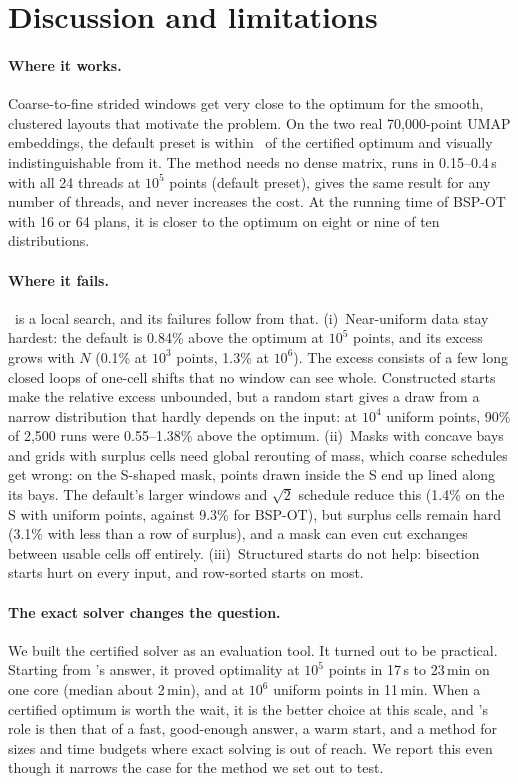 \section{Discussion and limitations}
\label{sec:discussion}

\paragraph{Where it works.} Coarse-to-fine strided windows get very close
to the optimum for the smooth, clustered layouts that motivate the problem. On the two
real 70{,}000-point UMAP embeddings, the default preset is within \RealBalancedExcess\ of
the certified optimum and visually indistinguishable from it. The method needs no dense
matrix, runs in 0.15--0.4\,s with all 24 threads at $10^5$ points (default preset), gives the
same result for any number of threads, and never increases the cost. At the running time of
BSP-OT with 16 or 64 plans, it is closer to the optimum on eight or nine of ten distributions.

\paragraph{Where it fails.} \ShuffleSnap\ is a local search, and its failures
follow from that. (i)~Near-uniform data stay hardest: the default is 0.84\% above the
optimum at $10^5$ points, and its excess grows with $N$ (0.1\% at $10^3$ points, 1.3\% at
$10^6$). The excess consists of a few long closed loops of one-cell shifts that no
window can see whole. Constructed starts make the relative excess unbounded, but a random
start gives a draw from a narrow distribution that hardly depends on the input: at $10^4$
uniform points, 90\% of 2{,}500 runs were 0.55--1.38\% above the optimum. (ii)~Masks with concave bays and grids with surplus cells need global
rerouting of mass, which coarse schedules get wrong: on the S-shaped mask, points drawn
inside the S end up lined along its bays. The default's larger windows and $\sqrt2$ schedule
reduce this (1.4\% on the S with uniform points, against 9.3\% for BSP-OT), but surplus cells
remain hard (3.1\% with less than a row of surplus), and a mask can even cut exchanges
between usable cells off entirely. (iii)~Structured starts do not help: bisection starts
hurt on every input, and row-sorted starts on most.

\paragraph{The exact solver changes the question.} We built the certified solver as an
evaluation tool. It turned out to be practical. Starting from \ShuffleSnap's answer, it proved optimality
at $10^5$ points in 17\,s to 23\,min on one core (median about 2\,min), and at $10^6$
uniform points in 11\,min.
When a certified optimum is worth the wait, it is the better choice at this scale, and
\ShuffleSnap's role is then that of a fast, good-enough answer, a warm start, and a
method for sizes and time budgets where exact solving is out of reach. We report this
even though it narrows the case for the method we set out to test.

